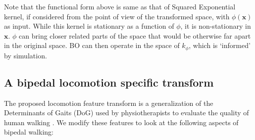 Note that the functional form above is same as that of Squared Exponential kernel, if considered from the point of view of the transformed space, with $\phi(\pmb{x})$ as input. While this kernel is stationary as a function of $\phi$, it is non-stationary in $\pmb{x}$. $\phi$ can bring closer related parts of the space that would be otherwise far apart in the original space. BO can then operate in the space of $k_{\phi}$, which is `informed' by simulation.

\subsection{A bipedal locomotion specific transform}
\label{sec:dog_transform}
The proposed locomotion feature transform is a generalization of the Determinants of Gaits (DoG) used by physiotherapists to evaluate the quality of human walking \citep{inman1953major}. We modify these features to look at the following aspects of bipedal walking:

